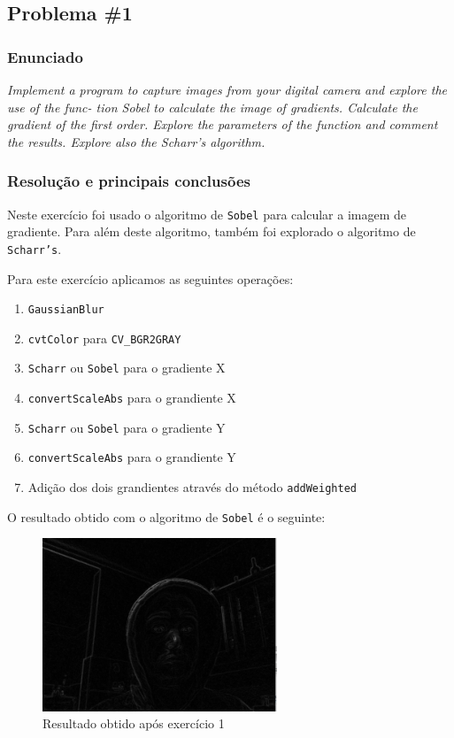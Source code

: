 \documentclass[portuguese, times, mirror]{revdetua}
\begin{document}
\subsection{Problema \#1}

\subsubsection{Enunciado}
\textit{ Implement a program to capture images from your digital camera and explore the use of the func-
tion Sobel to calculate the image of gradients. Calculate the gradient of the first order. Explore
the parameters of the function and comment the results. Explore also the Scharr’s algorithm.}


\subsubsection{Resolução e principais conclusões}

Neste exercício foi usado o algoritmo de \texttt{Sobel} para calcular a imagem de gradiente. Para além deste algoritmo, também foi explorado o algoritmo de \texttt{Scharr’s}. 

Para este exercício aplicamos as seguintes operações: 

\begin{enumerate}
    \item \texttt{GaussianBlur}
    \item \texttt{cvtColor} para \texttt{CV\_BGR2GRAY }
    \item \texttt{Scharr} ou \texttt{Sobel} para o gradiente X
    \item \texttt{convertScaleAbs} para o grandiente X
    \item \texttt{Scharr} ou \texttt{Sobel} para o gradiente Y
    \item \texttt{convertScaleAbs} para o grandiente Y
    \item Adição dos dois grandientes através do método \texttt{addWeighted}
    
\end{enumerate}


O resultado obtido com o algoritmo de \texttt{Sobel} é o seguinte: 

\begin{figure}[ht!]
\centering
\includegraphics[width=70mm]{img/ex1.png}
\caption{Resultado obtido após exercício 1}
\end{figure}
\end{document}
